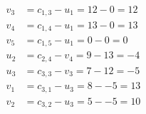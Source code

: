 \[
\begin{aligned}
v_{3} &= c_{1,3} - u_{1} = 12 - 0 = 12 \\
v_{4} &= c_{1,4} - u_{1} = 13 - 0 = 13 \\
v_{5} &= c_{1,5} - u_{1} = 0 - 0 = 0 \\
u_{2} &= c_{2,4} - v_{4} = 9 - 13 = -4 \\
u_{3} &= c_{3,3} - v_{3} = 7 - 12 = -5 \\
v_{1} &= c_{3,1} - u_{3} = 8 - -5 = 13 \\
v_{2} &= c_{3,2} - u_{3} = 5 - -5 = 10 \\
\end{aligned}
\]

